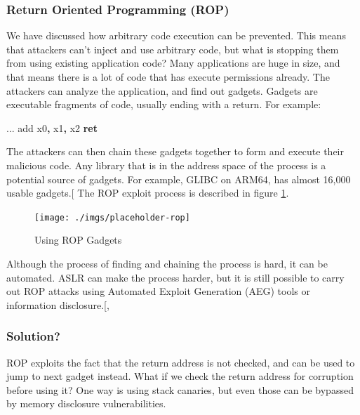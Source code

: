 \documentclass[a4paper, nobind]{templates/ociamthesis}
\newenvironment{Shaded}{\begin{snugshade}}{\end{snugshade}}
\newcommand{\BuiltInTok}[1]{#1}
\newcommand{\ControlFlowTok}[1]{\textcolor[rgb]{0.13,0.29,0.53}{\textbf{#1}}}
\newcommand{\NormalTok}[1]{#1}
\newcommand{\OperatorTok}[1]{\textcolor[rgb]{0.81,0.36,0.00}{\textbf{#1}}}
\renewenvironment{Shaded}
{
  \vspace{10pt}%
  \begin{snugshade}%
}{%
  \end{snugshade}%
  \vspace{8pt}%
}
\begin{document}
\subsubsection{Return Oriented Programming (ROP)}\label{return-oriented-programming-rop}

We have discussed how arbitrary code execution can be prevented.
This means that attackers can't inject and use arbitrary code, but what is stopping
them from using existing application code? Many applications are huge in size,
and that means there is a lot of code that has execute permissions already.
The attackers can analyze the application, and find out gadgets. Gadgets are executable
fragments of code, usually ending with a return. For example:

\begin{Shaded}
\begin{Highlighting}[]
\NormalTok{...}
\BuiltInTok{add}\NormalTok{ x0}\OperatorTok{,}\NormalTok{ x1}\OperatorTok{,}\NormalTok{ x2}
\ControlFlowTok{ret}
\end{Highlighting}
\end{Shaded}

The attackers can then chain these gadgets together to form and execute their malicious code.
Any library that is in the address space of the process is a potential source of gadgets.
For example, GLIBC on ARM64, has almost 16,000 usable gadgets.{[}\citeproc{ref-riscyrop}{12}{]}
The ROP exploit process is described in figure \ref{fig:rop-diag}.

\begin{figure}

{\centering \texttt{[image: ./imgs/placeholder-rop]} 

}

\caption{Using ROP Gadgets}\label{fig:rop-diag}
\end{figure}

Although the process of finding and chaining the process is hard, it can be automated.
ASLR can make the process harder, but it is still possible to carry out ROP attacks using
Automated Exploit Generation (AEG) tools or information disclosure.{[}, \citeproc{ref-riscyrop}{12}{]}

\subsubsection{Solution?}\label{solution}

ROP exploits the fact that the return address is not checked, and can be used to
jump to next gadget instead. What if we check the return address for corruption
before using it? One way is using stack canaries, but even those can be bypassed
by memory disclosure vulnerabilities.
\end{document}
